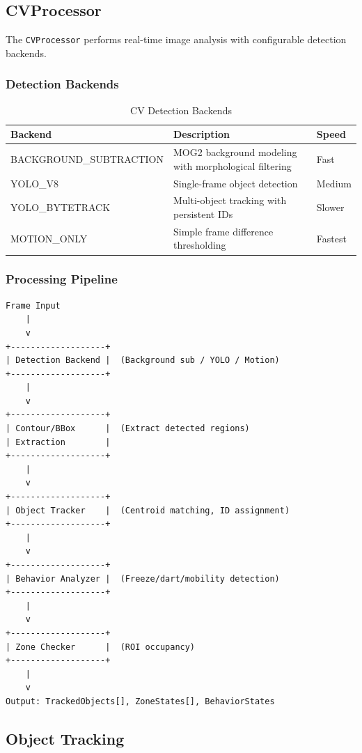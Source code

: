 \documentclass[11pt,a4paper]{article}
\begin{document}
\subsection{CVProcessor}

The \texttt{CVProcessor} performs real-time image analysis with configurable detection backends.

\subsubsection{Detection Backends}

\begin{table}[H]
\centering
\begin{tabular}{@{}lp{7cm}l@{}}
\toprule
\textbf{Backend} & \textbf{Description} & \textbf{Speed} \\
\midrule
BACKGROUND\_SUBTRACTION & MOG2 background modeling with morphological filtering & Fast \\
YOLO\_V8 & Single-frame object detection & Medium \\
YOLO\_BYTETRACK & Multi-object tracking with persistent IDs & Slower \\
MOTION\_ONLY & Simple frame difference thresholding & Fastest \\
\bottomrule
\end{tabular}
\caption{CV Detection Backends}
\end{table}

\subsubsection{Processing Pipeline}

\begin{verbatim}
Frame Input
    |
    v
+-------------------+
| Detection Backend |  (Background sub / YOLO / Motion)
+-------------------+
    |
    v
+-------------------+
| Contour/BBox      |  (Extract detected regions)
| Extraction        |
+-------------------+
    |
    v
+-------------------+
| Object Tracker    |  (Centroid matching, ID assignment)
+-------------------+
    |
    v
+-------------------+
| Behavior Analyzer |  (Freeze/dart/mobility detection)
+-------------------+
    |
    v
+-------------------+
| Zone Checker      |  (ROI occupancy)
+-------------------+
    |
    v
Output: TrackedObjects[], ZoneStates[], BehaviorStates
\end{verbatim}

\subsection{Object Tracking}
\end{document}
